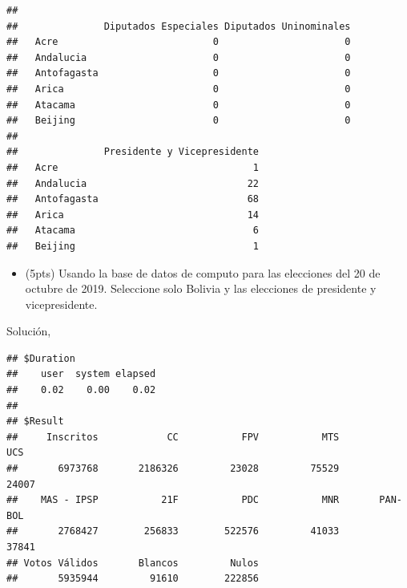\documentclass[
]{article}
\newenvironment{Shaded}{\begin{snugshade}}{\end{snugshade}}
\newcommand{\CommentTok}[1]{\textcolor[rgb]{0.56,0.35,0.01}{\textit{#1}}}
\newcommand{\ControlFlowTok}[1]{\textcolor[rgb]{0.13,0.29,0.53}{\textbf{#1}}}
\newcommand{\KeywordTok}[1]{\textcolor[rgb]{0.13,0.29,0.53}{\textbf{#1}}}
\newcommand{\NormalTok}[1]{#1}
\newcommand{\OperatorTok}[1]{\textcolor[rgb]{0.81,0.36,0.00}{\textbf{#1}}}
\providecommand{\tightlist}{%
  \setlength{\itemsep}{0pt}\setlength{\parskip}{0pt}}
\begin{document}
\begin{Shaded}
\end{Shaded}

\begin{verbatim}
##              
##               Diputados Especiales Diputados Uninominales
##   Acre                           0                      0
##   Andalucia                      0                      0
##   Antofagasta                    0                      0
##   Arica                          0                      0
##   Atacama                        0                      0
##   Beijing                        0                      0
##              
##               Presidente y Vicepresidente
##   Acre                                  1
##   Andalucia                            22
##   Antofagasta                          68
##   Arica                                14
##   Atacama                               6
##   Beijing                               1
\end{verbatim}

\begin{itemize}
\tightlist
\item
  (5pts) Usando la base de datos de computo para las elecciones del 20
  de octubre de 2019. Seleccione solo Bolivia y las elecciones de
  presidente y vicepresidente.
\end{itemize}

Solución,

\begin{verbatim}
## $Duration
##    user  system elapsed 
##    0.02    0.00    0.02 
## 
## $Result
##     Inscritos            CC           FPV           MTS           UCS 
##       6973768       2186326         23028         75529         24007 
##    MAS - IPSP           21F           PDC           MNR       PAN-BOL 
##       2768427        256833        522576         41033         37841 
## Votos Válidos       Blancos         Nulos 
##       5935944         91610        222856
\end{verbatim}
\end{document}
